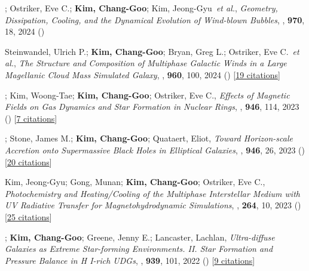 \item[{35.}]; Ostriker, Eve C.; \textbf{Kim, Chang-Goo}; Kim, Jeong-Gyu~\textit{et al.}, \textit{Geometry, Dissipation, Cooling, and the Dynamical Evolution of Wind-blown Bubbles}, , \textbf{970}, 18, 2024 ()

\item[{34.}]Steinwandel, Ulrich P.; \textbf{Kim, Chang-Goo}; Bryan, Greg L.; Ostriker, Eve C.~\textit{et al.}, \textit{The Structure and Composition of Multiphase Galactic Winds in a Large Magellanic Cloud Mass Simulated Galaxy}, , \textbf{960}, 100, 2024 () [\href{http://adsabs.harvard.edu/abs/2024ApJ...960..100S}{19 citations}]

\item[{33.}]; Kim, Woong-Tae; \textbf{Kim, Chang-Goo}; Ostriker, Eve C., \textit{Effects of Magnetic Fields on Gas Dynamics and Star Formation in Nuclear Rings}, , \textbf{946}, 114, 2023 () [\href{http://adsabs.harvard.edu/abs/2023ApJ...946..114M}{7 citations}]

\item[{32.}]; Stone, James M.; \textbf{Kim, Chang-Goo}; Quataert, Eliot, \textit{Toward Horizon-scale Accretion onto Supermassive Black Holes in Elliptical Galaxies}, , \textbf{946}, 26, 2023 () [\href{http://adsabs.harvard.edu/abs/2023ApJ...946...26G}{20 citations}]

\item[{31.}]Kim, Jeong-Gyu; Gong, Munan; \textbf{Kim, Chang-Goo}; Ostriker, Eve C., \textit{Photochemistry and Heating/Cooling of the Multiphase Interstellar Medium with UV Radiative Transfer for Magnetohydrodynamic Simulations}, , \textbf{264}, 10, 2023 () [\href{http://adsabs.harvard.edu/abs/2023ApJS..264...10K}{25 citations}]

\item[{30.}]; \textbf{Kim, Chang-Goo}; Greene, Jenny E.; Lancaster, Lachlan, \textit{Ultra-diffuse Galaxies as Extreme Star-forming Environments. II. Star Formation and Pressure Balance in H I-rich UDGs}, , \textbf{939}, 101, 2022 () [\href{http://adsabs.harvard.edu/abs/2022ApJ...939..101K}{9 citations}]

